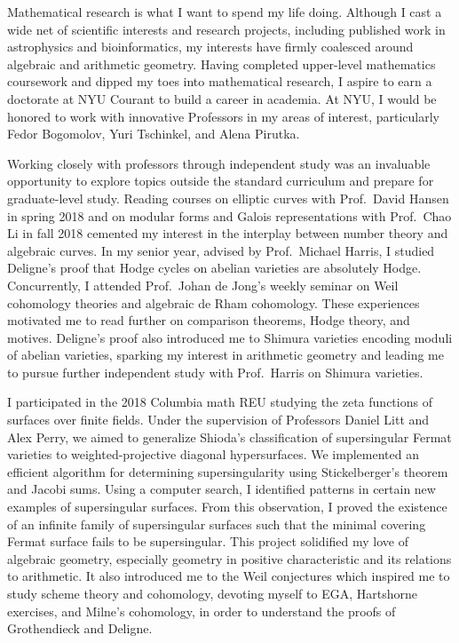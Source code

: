 \documentclass[11pt]{article}
\begin{document}
Mathematical research is what I want to spend my life doing. Although I cast a wide net of scientific interests and research projects, including published work in astrophysics and bioinformatics, my interests have firmly coalesced around algebraic and arithmetic geometry. Having completed upper-level mathematics coursework and dipped my toes into mathematical research, I aspire to earn a doctorate at NYU Courant to build a career in academia. At NYU, I would be honored to work with innovative Professors in my areas of interest, particularly Fedor Bogomolov, Yuri Tschinkel, and Alena Pirutka.
\par
Working closely with professors through independent study was an invaluable opportunity to explore topics outside the standard curriculum and prepare for graduate-level study. Reading courses on elliptic curves with Prof.\ David Hansen in spring 2018 and on modular forms and Galois representations with Prof.\ Chao Li in fall 2018 cemented my interest in the interplay between number theory and algebraic curves. In my senior year, advised by Prof.\ Michael Harris, I studied Deligne's proof that Hodge cycles on abelian varieties are absolutely Hodge. Concurrently, I attended Prof.\ Johan de Jong's weekly seminar on Weil cohomology theories and algebraic de Rham cohomology. These experiences motivated me to read further on comparison theorems, Hodge theory, and motives. Deligne's proof also introduced me to Shimura varieties encoding moduli of abelian varieties, sparking my interest in arithmetic geometry and leading me to pursue further independent study with Prof.\ Harris on Shimura varieties.
\par
I participated in the 2018 Columbia math REU studying the zeta functions of surfaces over finite fields. Under the supervision of Professors Daniel Litt and Alex Perry, we aimed to generalize Shioda’s classification of supersingular Fermat varieties  to weighted-projective diagonal hypersurfaces. We implemented an efficient algorithm for determining supersingularity using Stickelberger's theorem and Jacobi sums. Using a computer search, I identified patterns in certain new examples of supersingular surfaces. From this observation, I proved the existence of an infinite family of supersingular surfaces such that the minimal covering Fermat surface fails to be supersingular. This project solidified my love of algebraic geometry, especially geometry in positive characteristic and its relations to arithmetic. It also introduced me to the Weil conjectures which inspired me to study scheme theory and \etale cohomology, devoting myself to EGA, Hartshorne exercises, and Milne's \etale cohomology, in order to understand the proofs of Grothendieck and Deligne. 
\end{document}
